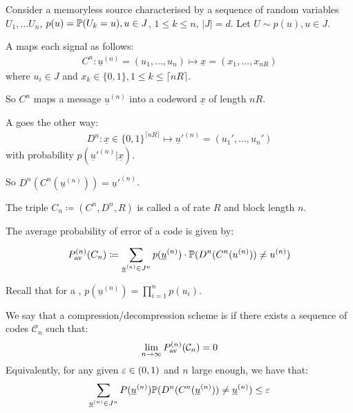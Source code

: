 \documentclass[]{article}
\begin{document}
\begin{defin*}
    Consider a memoryless source characterised by a sequence of random variables $U_1,\dots U_n$, $p(u) = \P(U_k = u),u\in J$, $1\le k\le n$, $|J| = d$. Let $U\sim p(u),u\in J$.

    A  maps each signal as follows:
    \begin{align*}
        C^n:\underline{u}^{(n)} = (u_1,\dots,u_n)\mapsto \underline{x} = (x_1,\dots,x_{nR})
    \end{align*} where $u_i \in J$ and $x_k \in \{0,1\}, 1\le k\le \lceil nR \rceil $.
    
     So $C^n$ maps a message $\underline{u}^{(n)}$ into a codeword $\underline{x}$ of length $nR$.

     A  goes the other way:
     \begin{align*}
         D^n : \underline{x} \in \{0,1\}^{\lceil nR \rceil} \mapsto \underline{u}'^{(n)} = (u_1',\dots,u_n')
     \end{align*} with probability $p(\underline{u}'^{(n)}|\underline{x})$.

     So $D^n(C^n(\underline{u}^{(n)})) = \underline{u}'^{(n)}$.

     The triple $C_n \coloneqq (C^n,D^n,R)$ is called a  of rate $R$ and block length $n$.

     The average probability of error of a code is given by:

     \begin{align*}
         P_{\textrm{av}}^{(n)}(C_n) \coloneqq \sum_{\underline{u}^{(n)}\in J^n}p(\underline{u}^{(n)})\cdot \P(D^n(C^n(u^{(n)}))\ne u^{(n)})
     \end{align*}
\end{defin*}


Recall that for a , $p(\underline{u}^{(n)}) = \prod_{i=1}^{n}p(u_i)$.

We say that a compression/decompression scheme is  if there exists a sequence of codes $\mathcal{C}_n$ such that:
\begin{align*}
    \lim\limits_{n\ra\infty}P_{\textrm{av}}^{(n)}(\mathcal{C}_n) = 0
\end{align*}
Equivalently, for any given $\eps \in (0,1)$ and $n$ large enough, we have that:
\begin{align*}
    \sum_{\underline{u}^{(n)}\in J^n}P(\underline{u}^{(n)})\P(D^n(C^n(\underline{u}^{(n)}))\ne \underline{u}^{(n)})\le \eps
\end{align*}
\end{document}
